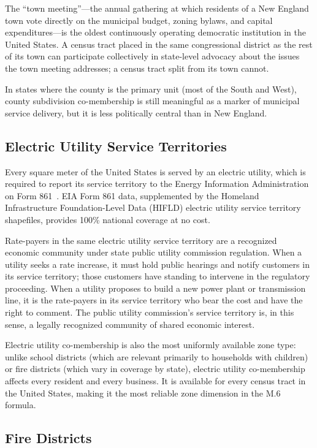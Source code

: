 The ``town meeting''---the annual gathering at which residents of a New England town
vote directly on the municipal budget, zoning bylaws, and capital expenditures---is
the oldest continuously operating democratic institution in the United States.
A census tract placed in the same congressional district as the rest of its town
can participate collectively in state-level advocacy about the issues the town
meeting addresses; a census tract split from its town cannot.

In states where the county is the primary unit (most of the South and West),
county subdivision co-membership is still meaningful as a marker of municipal
service delivery, but it is less politically central than in New England.

\subsection{Electric Utility Service Territories}

Every square meter of the United States is served by an electric utility, which
is required to report its service territory to the Energy Information Administration
on Form 861~\citep{eia861}.
EIA Form 861 data, supplemented by the Homeland Infrastructure Foundation-Level
Data (HIFLD) electric utility service territory shapefiles, provides 100\% national
coverage at no cost.

Rate-payers in the same electric utility service territory are a recognized economic
community under state public utility commission regulation.
When a utility seeks a rate increase, it must hold public hearings and notify customers
in its service territory; those customers have standing to intervene in the regulatory
proceeding.
When a utility proposes to build a new power plant or transmission line, it is the
rate-payers in its service territory who bear the cost and have the right to comment.
The public utility commission's service territory is, in this sense, a legally
recognized community of shared economic interest.

Electric utility co-membership is also the most uniformly available zone type:
unlike school districts (which are relevant primarily to households with children)
or fire districts (which vary in coverage by state), electric utility co-membership
affects every resident and every business.
It is available for every census tract in the United States, making it the most
reliable zone dimension in the M.6 formula.

\subsection{Fire Districts}

